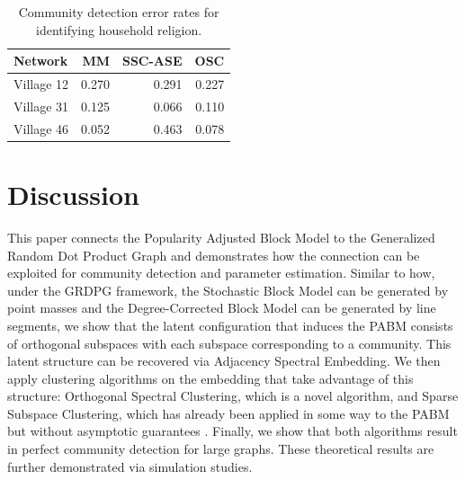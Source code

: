 \documentclass[12pt]{article}
\begin{document}
\begin{table}

\caption{\label{tab:households-table}Community detection error rates for identifying household religion.}
\centering
\begin{tabular}[t]{l|r|r|r}
\hline
Network & MM & SSC-ASE & OSC\\
\hline
Village 12 & 0.270 & 0.291 & 0.227\\
\hline
Village 31 & 0.125 & 0.066 & 0.110\\
\hline
Village 46 & 0.052 & 0.463 & 0.078\\
\hline
\end{tabular}
\end{table}

\hypertarget{discussion}{%
\section{Discussion}\label{discussion}}

This paper connects the Popularity Adjusted Block Model to the 
Generalized Random Dot Product Graph and demonstrates how the connection 
can be exploited for community detection and parameter estimation. 
Similar to how, under the GRDPG framework, 
the Stochastic Block Model can be generated by point masses and 
the Degree-Corrected Block Model can be generated by line segments, 
we show that the latent configuration that induces the PABM 
consists of orthogonal subspaces 
with each subspace corresponding to a community. 
This latent structure can be recovered via Adjacency Spectral Embedding. 
We then apply clustering algorithms on the embedding 
that take advantage of this structure: 
Orthogonal Spectral Clustering, which is a novel algorithm, 
and Sparse Subspace Clustering, which has already been applied 
in some way to the PABM but 
without asymptotic guarantees \cite{noroozi2019estimation}. 
Finally, we show that both algorithms result in perfect community detection 
for large graphs. 
These theoretical results are further demonstrated via simulation studies. 

\appendix
\renewcommand\refname{References}
  
\end{document}
